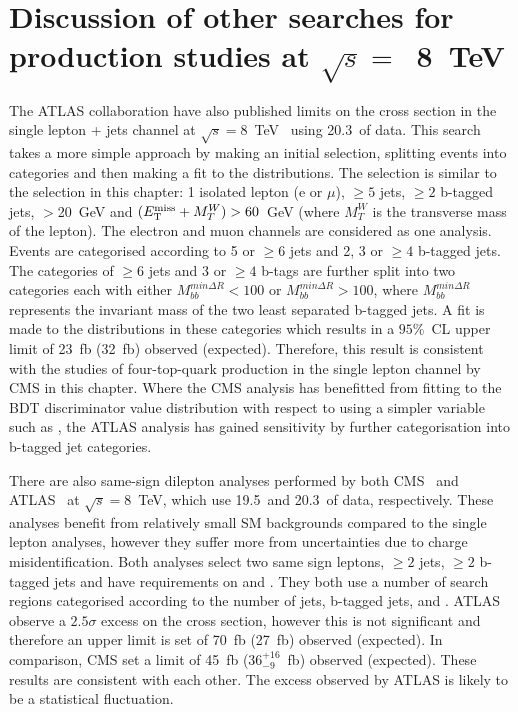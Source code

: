 \section{Discussion of other searches for \tttt production studies at $\sqrt{s} =$~8~TeV}
\label{sec:ATLASresult}
 
The ATLAS collaboration have also published limits on the \tttt cross section in the single lepton + jets channel at $\sqrt{s}=8$~TeV~\cite{Aad:2015kqa} using 20.3~\fbinv of data. This search takes a more simple approach by making an initial selection, splitting events into categories and then making a fit to the \HT distributions. The selection is similar to the selection in this chapter: 1 isolated lepton (e or $\mu$), $\geq 5$ jets, $\geq 2$ b-tagged jets, \MET$>$20~GeV and $(E_{\mathrm{T}}^{\text{miss}}+M_{T}^{W})>60$~GeV (where $M_{T}^{W}$ is the transverse mass of the lepton). The electron and muon channels are considered as one analysis. Events are categorised according to 5 or $\geq 6$ jets and 2, 3 or $\geq 4$ b-tagged jets. The categories of $\geq 6$ jets and 3 or $\geq 4$ b-tags are further split into two categories each with either $M_{bb}^{min\Delta R}<100$ or $M_{bb}^{min\Delta R}>100$, where $M_{bb}^{min\Delta R}$ represents the invariant mass of the two least separated b-tagged jets. A fit is made to the \HT distributions in these categories which results in a $95\%$~CL upper limit of 23~fb (32~fb) observed (expected). 
Therefore, this result is consistent with the studies of four-top-quark production in the single lepton channel by CMS in this chapter. Where the CMS analysis has benefitted from fitting to the BDT discriminator value distribution with respect to using a simpler variable such as \HT, the ATLAS analysis has gained sensitivity by further categorisation into b-tagged jet categories.

There are also same-sign dilepton analyses performed by both CMS~\cite{Chatrchyan:2013fea} and ATLAS~\cite{Aad:2015gdg} at $\sqrt{s}=8$~TeV, which use 19.5~\fbinv and 20.3~\fbinv of data, respectively. These analyses benefit from relatively small SM backgrounds compared to the single lepton analyses, however they suffer more from uncertainties due to charge misidentification. Both analyses select two same sign leptons, $\geq 2$ jets, $\geq 2$ b-tagged jets and have requirements on \HT and \MET. They both use a number of search regions categorised according to the number of jets, b-tagged jets, \HT and \MET. ATLAS observe a $2.5 \sigma$ excess on the \tttt cross section, however this is not significant and therefore an upper limit is set of 70~fb (27~fb) observed (expected). In comparison, CMS set a limit of 45~fb ($36^{+16}_{-9}$~fb) observed (expected). These results are consistent with each other. The excess observed by ATLAS is likely to be a statistical fluctuation. 

